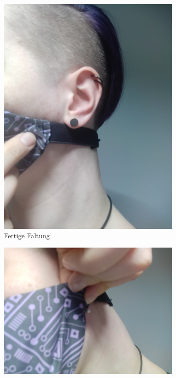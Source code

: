 \documentclass[12pt,parskip=full]{scrartcl}
\begin{document}
\begin{figure}[ht]
\begin{subfigure}{0.48\textwidth}
        \includegraphics[width = \linewidth]{Pictures/11_Folding/Folding3.jpg}
        \caption{Fertige Faltung}
        \label{Folding3}
    \end{subfigure}
    \begin{subfigure}{0.48\textwidth}
        \centering
        \includegraphics[width = \linewidth]{Pictures/11_Folding/Folding4.jpg}

\end{subfigure}
\end{figure}
\end{document}
